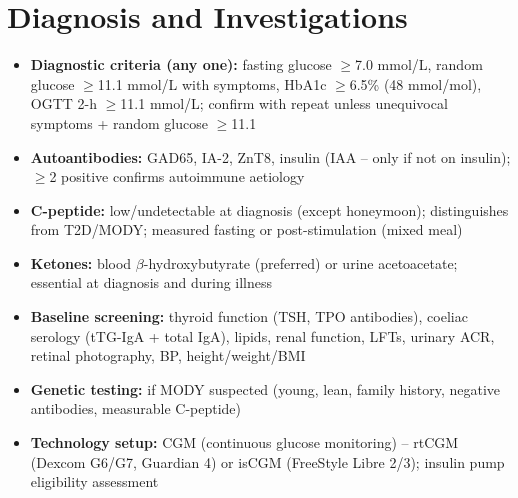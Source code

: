 \section*{Diagnosis and Investigations}
\begin{itemize}
    \item \textbf{Diagnostic criteria (any one):} fasting glucose $\ge$7.0 mmol/L, random glucose $\ge$11.1 mmol/L with symptoms, HbA1c $\ge$6.5\% (48 mmol/mol), OGTT 2-h $\ge$11.1 mmol/L; confirm with repeat unless unequivocal symptoms + random glucose $\ge$11.1
    \item \textbf{Autoantibodies:} GAD65, IA-2, ZnT8, insulin (IAA -- only if not on insulin); $\ge$2 positive confirms autoimmune aetiology
    \item \textbf{C-peptide:} low/undetectable at diagnosis (except honeymoon); distinguishes from T2D/MODY; measured fasting or post-stimulation (mixed meal)
    \item \textbf{Ketones:} blood $\beta$-hydroxybutyrate (preferred) or urine acetoacetate; essential at diagnosis and during illness
    \item \textbf{Baseline screening:} thyroid function (TSH, TPO antibodies), coeliac serology (tTG-IgA + total IgA), lipids, renal function, LFTs, urinary ACR, retinal photography, BP, height/weight/BMI
    \item \textbf{Genetic testing:} if MODY suspected (young, lean, family history, negative antibodies, measurable C-peptide)
    \item \textbf{Technology setup:} CGM (continuous glucose monitoring) -- rtCGM (Dexcom G6/G7, Guardian 4) or isCGM (FreeStyle Libre 2/3); insulin pump eligibility assessment
\end{itemize}

